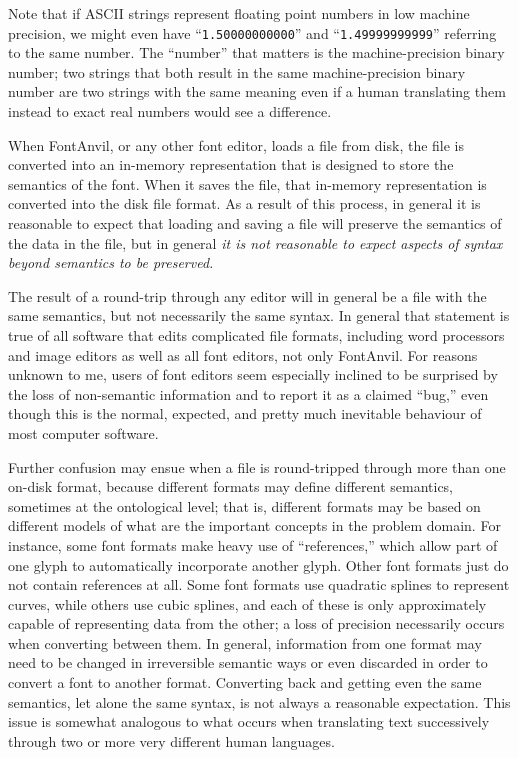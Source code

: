 Note that if ASCII strings represent floating point numbers in low machine
precision, we might even have ``\texttt{1.50000000000}'' and
``\texttt{1.49999999999}'' referring to the same number.  The ``number''
that matters is the machine-precision binary number; two strings that both
result in the same machine-precision binary number are two strings with the
same meaning even if a human translating them instead to exact real numbers
would see a difference.

When FontAnvil, or any other font editor, loads a file from disk, the file
is converted into an in-memory representation that is designed to store the
semantics of the font.  When it saves the file, that in-memory
representation is converted into the disk file format.  As a result of this
process, in general it is reasonable to expect that loading and saving a
file will preserve the semantics of the data in the file, but in general
\emph{it is not reasonable to expect aspects of syntax beyond semantics to
be preserved.}

The result of a round-trip through any editor will in general be a file with
the same semantics, but not necessarily the same syntax.  In general that
statement is true of all software that edits complicated file formats,
including word processors and image editors as well as all font editors, not
only FontAnvil.  For reasons unknown to me, users of font editors seem
especially inclined to be surprised by the loss of non-semantic information
and to report it as a claimed ``bug,'' even though this is the normal,
expected, and pretty much inevitable behaviour of most computer
software.

Further confusion may ensue when a file is round-tripped through more than
one on-disk format, because different formats may define different
semantics, sometimes at the ontological level; that is, different formats
may be based on different models of what are the important concepts in the
problem domain.  For instance, some font formats make heavy use of
``references,'' which allow part of one glyph to automatically incorporate
another glyph.  Other font formats just do not contain references at all. 
Some font formats use quadratic splines to represent curves, while others
use cubic splines, and each of these is only approximately capable of
representing data from the other; a loss of precision necessarily occurs
when converting between them.  In general, information from one
format may need to be changed in irreversible semantic ways or even
discarded in order to convert a font to another format.  Converting back and
getting even the same semantics, let alone the same syntax, is not always a
reasonable expectation.  This issue is somewhat analogous to what occurs
when translating text successively through two or more very different human
languages.

